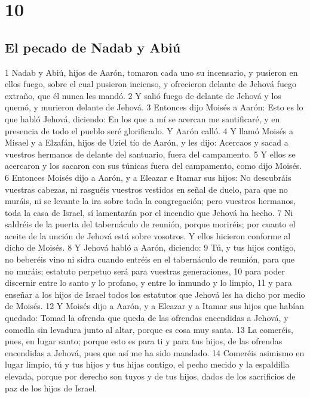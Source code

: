 \chapter{10}

\section{El pecado de Nadab y Abiú}

1 Nadab y Abiú, hijos de Aarón, tomaron cada uno su incensario, y pusieron en ellos fuego, sobre el cual pusieron incienso, y ofrecieron delante de Jehová fuego extraño, que él nunca les mandó.
2 Y salió fuego de delante de Jehová y los quemó, y murieron delante de Jehová.
3 Entonces dijo Moisés a Aarón: Esto es lo que habló Jehová, diciendo: En los que a mí se acercan me santificaré, y en presencia de todo el pueblo seré glorificado. Y Aarón calló.
4 Y llamó Moisés a Misael y a Elzafán, hijos de Uziel tío de Aarón, y les dijo: Acercaos y sacad a vuestros hermanos de delante del santuario, fuera del campamento.
5 Y ellos se acercaron y los sacaron con sus túnicas fuera del campamento, como dijo Moisés.
6 Entonces Moisés dijo a Aarón, y a Eleazar e Itamar sus hijos: No descubráis vuestras cabezas, ni rasguéis vuestros vestidos en señal de duelo, para que no muráis, ni se levante la ira sobre toda la congregación; pero vuestros hermanos, toda la casa de Israel, sí lamentarán por el incendio que Jehová ha hecho.
7 Ni saldréis de la puerta del tabernáculo de reunión, porque moriréis; por cuanto el aceite de la unción de Jehová está sobre vosotros. Y ellos hicieron conforme al dicho de Moisés.
8 Y Jehová habló a Aarón, diciendo:
9 Tú, y tus hijos contigo, no beberéis vino ni sidra cuando entréis en el tabernáculo de reunión, para que no muráis; estatuto perpetuo será para vuestras generaciones,
10 para poder discernir entre lo santo y lo profano, y entre lo inmundo y lo limpio,
11 y para enseñar a los hijos de Israel todos los estatutos que Jehová les ha dicho por medio de Moisés.
12 Y Moisés dijo a Aarón, y a Eleazar y a Itamar sus hijos que habían quedado: Tomad la ofrenda que queda de las ofrendas encendidas a Jehová, y comedla sin levadura junto al altar, porque es cosa muy santa.
13 La comeréis, pues, en lugar santo; porque esto es para ti y para tus hijos, de las ofrendas encendidas a Jehová, pues que así me ha sido mandado.
14 Comeréis asimismo en lugar limpio, tú y tus hijos y tus hijas contigo, el pecho mecido y la espaldilla elevada, porque por derecho son tuyos y de tus hijos, dados de los sacrificios de paz de los hijos de Israel.
